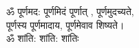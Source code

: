 ॐ पूर्णमद: पूर्णमिदं पूर्णात् , पूर्णमुदच्यते,\\
पूर्णस्य पूर्णमादाय, पूर्णमेवाव शिष्यते।\\
ॐ शांति: शांति: शांतिः\\